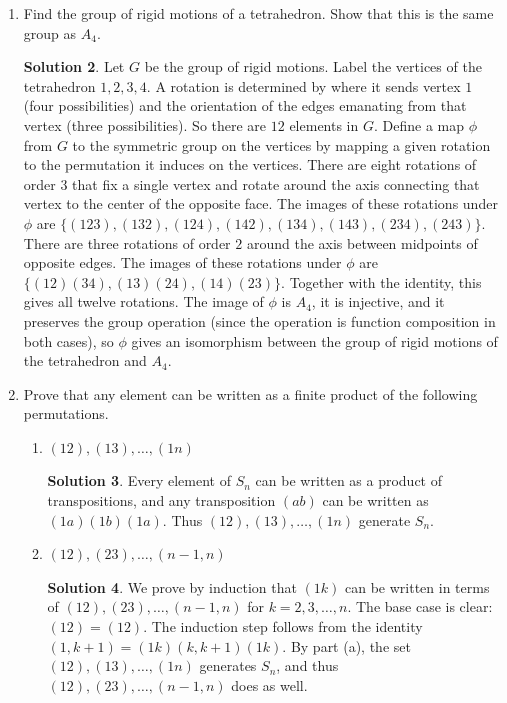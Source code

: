 \documentclass{article}
\theoremstyle{definition}
\newtheorem*{solution}{Solution}
\begin{document}
\begin{enumerate}
\begin{solution}
Therefore the orders of elements in $S_7$ are $1,2,3,4,5,6,7,10,12$ and the orders of elements in $A_7$ are $1,2,3,4,5,6,7$.
\end{solution}
\item[5.16.] Find the group of rigid motions of a tetrahedron. Show that this is the same group as $A_4$.
\begin{solution}
Let $G$ be the group of rigid motions.  Label the vertices of the tetrahedron $1,2,3,4$.  A rotation is determined by where it sends vertex $1$ (four possibilities) and the orientation of the edges emanating from that vertex (three possibilities).  So there are $12$ elements in $G$.  Define a map $\phi$ from $G$ to the symmetric group on the vertices by mapping a given rotation to the permutation it induces on the vertices.  There are eight rotations of order $3$ that fix a single vertex and rotate around the axis connecting that vertex to the center of the opposite face.  The images of these rotations under $\phi$ are $\{(123),(132),(124),(142),(134),(143),(234),(243)\}$.  There are three rotations of order $2$ around the axis between midpoints of opposite edges.  The images of these rotations under $\phi$ are $\{(12)(34),(13)(24),(14)(23)\}$.  Together with the identity, this gives all twelve rotations.  The image of $\phi$ is $A_4$, it is injective, and it preserves the group operation (since the operation is function composition in both cases), so $\phi$ gives an isomorphism between the group of rigid motions of the tetrahedron and $A_4$.
\end{solution}
\item[5.26.] Prove that any element can be written as a finite product of the following permutations.
\begin{enumerate}
\item $(12),(13),\dots,(1n)$
\begin{solution}
Every element of $S_n$ can be written as a product of transpositions, and any transposition $(ab)$ can be written as $(1a)(1b)(1a)$.  Thus $(12),(13),\dots,(1n)$ generate $S_n$.
\end{solution}
\item $(12),(23),\dots,(n-1,n)$
\begin{solution}
We prove by induction that $(1k)$ can be written in terms of $(12),(23),\dots,(n-1,n)$ for $k = 2,3,\dots,n$.  The base case is clear: $(12) = (12)$.  The induction step follows from the identity $(1,k+1) = (1k)(k,k+1)(1k)$. By part (a), the set $(12),(13),\dots,(1n)$ generates $S_n$, and thus $(12),(23),\dots,(n-1,n)$ does as well.

\end{solution}
\end{enumerate}
\end{enumerate}
\end{document}
